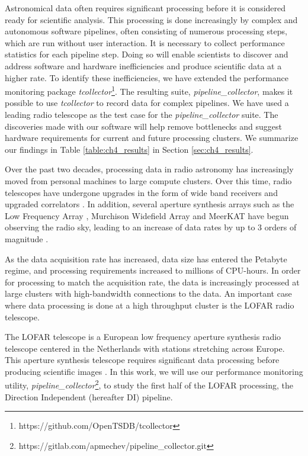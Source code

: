 Astronomical data often requires significant processing before it is considered ready for scientific analysis. This processing is done increasingly by complex and autonomous software pipelines, often consisting of numerous processing steps, which are run without user interaction. It is necessary to collect performance statistics for each pipeline step. Doing so will enable scientists to discover and address software and hardware inefficiencies and produce scientific data at a higher rate. To identify these inefficiencies, we have extended the performance monitoring package \textit{tcollector}\footnote{https://github.com/OpenTSDB/tcollector}\citep{tcollector}. The resulting suite, \textit{pipeline\_collector}, makes it possible to use \textit{tcollector} to record data for complex pipelines. We have used a leading radio telescope as the test case for the \textit{pipeline\_collector} suite. The discoveries made with our software will help remove bottlenecks and suggest hardware requirements for current and future processing clusters. We summarize our findings in Table \ref{table:ch4_results} in Section \ref{sec:ch4_results}.

Over the past two decades, processing data in radio astronomy has increasingly moved from personal machines to large compute clusters. Over this time, radio telescopes have undergone upgrades in the form of wide band receivers and upgraded correlators \citep{lofarcobalt,gmrt_upgrade}. In addition, several aperture synthesis arrays such as the Low Frequency Array \citep[LOFAR,][]{LOFAR}, Murchison Widefield Array \citep[MWA][]{MWA,mwa2} and MeerKAT \citep{meerkat} have begun observing the radio sky, leading to an increase of data rates by up to 3 orders of magnitude \citep{mwa_data_size,meerkat_size}.

As the data acquisition rate has increased, data size has entered the Petabyte regime, and processing requirements increased to millions of CPU-hours. In order for processing to match the acquisition rate, the data is increasingly processed at large clusters with high-bandwidth connections to the data. An important case where data processing is done at a high throughput cluster is the LOFAR radio telescope.

The LOFAR telescope is a European low frequency aperture synthesis radio telescope centered in the Netherlands with stations stretching across Europe. This aperture synthesis telescope requires significant data processing before producing scientific images \citep{vanweeren2016,Wendy_bootes,tassesmirnov,oonk_2014}. In this work, we will use our performance monitoring utility, \textit{pipeline\_collector}\footnote{https://gitlab.com/apmechev/pipeline\_collector.git}, to study the first half of the LOFAR processing, the Direction Independent (hereafter  DI) pipeline. 

